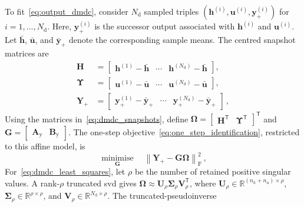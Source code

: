 To fit~\eqref{eq:output_dmdc}, consider $N_\mathrm{d}$ sampled triples
$(\mathbf{h}^{(i)},\mathbf{u}^{(i)},\mathbf{y}_+^{(i)})$ for
$i=1,\dots,N_\mathrm{d}$. Here, $\mathbf{y}_+^{(i)}$ is the successor output associated with
$\mathbf{h}^{(i)}$ and $\mathbf{u}^{(i)}$. Let $\bar{\mathbf{h}}$,
$\bar{\mathbf{u}}$, and $\bar{\mathbf{y}}_+$ denote the corresponding sample means. The
centred snapshot matrices are
%
\begin{align}
    \mathbf{H}
    &= \begin{bmatrix}
        \mathbf{h}^{(1)}-\bar{\mathbf{h}} & \cdots &
        \mathbf{h}^{(N_\mathrm{d})}-\bar{\mathbf{h}}
      \end{bmatrix}, \nonumber \\
    \boldsymbol{\Upsilon}
    &= \begin{bmatrix}
        \mathbf{u}^{(1)}-\bar{\mathbf{u}} & \cdots &
        \mathbf{u}^{(N_\mathrm{d})}-\bar{\mathbf{u}}
      \end{bmatrix}, \nonumber \\
    \mathbf{Y}_+
    &= \begin{bmatrix}
        \mathbf{y}_+^{(1)}-\bar{\mathbf{y}}_+ & \cdots &
        \mathbf{y}_+^{(N_\mathrm{d})}-\bar{\mathbf{y}}_+
      \end{bmatrix} \,,
    \label{eq:dmdc_snapshots}
\end{align}
%
Using the matrices in~\eqref{eq:dmdc_snapshots}, define
$\boldsymbol{\Omega}=
\begin{bmatrix}\mathbf{H}^\mathsf{T}&\boldsymbol{\Upsilon}^\mathsf{T}\end{bmatrix}^\mathsf{T}$
and
$\mathbf{G}=\begin{bmatrix}\mathbf{A}_\mathrm{y}&\mathbf{B}_\mathrm{y}\end{bmatrix}$.
The one-step objective~\eqref{eq:one_step_identification}, restricted to this affine model, is
%
\begin{equation}
    \underset{\mathbf{G}}{\operatorname{minimise}}
    \quad
    \left\|\mathbf{Y}_+-\mathbf{G}\boldsymbol{\Omega}\right\|_\mathrm{F}^2 \,,
    \label{eq:dmdc_least_squares}
\end{equation}
%
For~\eqref{eq:dmdc_least_squares}, let $\rho$ be the number of retained positive singular
values. A rank-$\rho$ truncated \ac{svd} gives
$\boldsymbol{\Omega}\approx\mathbf{U}_\rho\boldsymbol{\Sigma}_\rho
\mathbf{V}_\rho^\mathsf{T}$, where
$\mathbf{U}_\rho\in\mathbb{R}^{(n_h+n_u)\times\rho}$,
$\boldsymbol{\Sigma}_\rho\in\mathbb{R}^{\rho\times\rho}$, and
$\mathbf{V}_\rho\in\mathbb{R}^{N_\mathrm{d}\times\rho}$. The truncated-pseudoinverse
